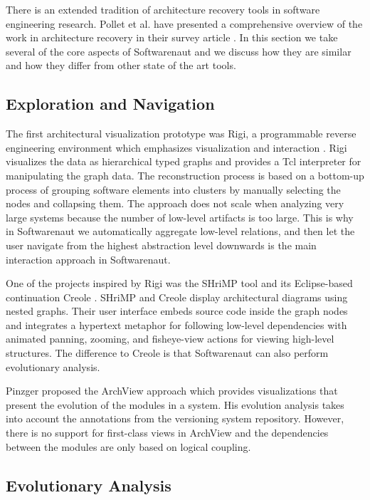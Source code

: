 \documentclass[preprint,12pt]{elsarticle}
\begin{document}
There is an extended tradition of architecture recovery tools in software engineering research. Pollet et al. have presented a comprehensive overview of the work in architecture recovery in their survey article \cite{pollet-sar}. In this section we take several of the core aspects of Softwarenaut and we discuss how they are similar and how they differ from other state of the art tools.

\subsection {Exploration and Navigation} 

The first architectural visualization prototype was Rigi, a programmable reverse engineering environment which emphasizes visualization and interaction \cite{muller-revengenv}. Rigi  visualizes the data as hierarchical typed graphs and provides a Tcl interpreter for manipulating the graph data. The reconstruction process is based on a bottom-up process of grouping  software elements into clusters by manually selecting the nodes and collapsing them. The approach does not scale when analyzing very large systems because the number of low-level artifacts is too large. This is why in Softwarenaut we automatically aggregate low-level relations, and then let the user navigate from the highest abstraction level downwards is the main interaction approach in Softwarenaut. 

One of the projects inspired by Rigi was the SHriMP tool \cite{storey-shrimp} and its Eclipse-based continuation Creole \cite{lintern-creole}. SHriMP and Creole display architectural diagrams using nested graphs. Their user interface embeds source code inside the graph nodes and integrates a hypertext metaphor for following low-level dependencies with animated panning, zooming, and fisheye-view actions for viewing high-level structures. The difference to Creole is that Softwarenaut can also perform evolutionary analysis.

Pinzger proposed the ArchView approach \cite{pinzger-thesis} which provides visualizations that present the evolution of the modules in a system. His evolution analysis takes into account the annotations from the versioning system repository. However, there is no support for first-class views in ArchView and the dependencies between the modules are only based on logical coupling. 

\subsection {Evolutionary Analysis}
 
\end{document}
